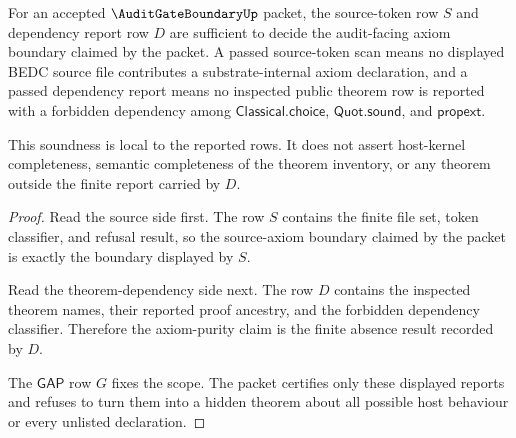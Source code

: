 \begin{theorem}
\label{thm:audit-gate-boundary-axiom-purity-soundness}
For an accepted $\AuditGateBoundaryUp$ packet, the source-token row $S$ and dependency report row $D$ are sufficient to decide the audit-facing axiom boundary claimed by the packet. A passed source-token scan means no displayed BEDC source file contributes a substrate-internal axiom declaration, and a passed dependency report means no inspected public theorem row is reported with a forbidden dependency among $\mathsf{Classical.choice}$, $\mathsf{Quot.sound}$, and $\mathsf{propext}$.

This soundness is local to the reported rows. It does not assert host-kernel completeness, semantic completeness of the theorem inventory, or any theorem outside the finite report carried by $D$.
\end{theorem}
\begin{proof}
Read the source side first. The row $S$ contains the finite file set, token classifier, and refusal result, so the source-axiom boundary claimed by the packet is exactly the boundary displayed by $S$.

Read the theorem-dependency side next. The row $D$ contains the inspected theorem names, their reported proof ancestry, and the forbidden dependency classifier. Therefore the axiom-purity claim is the finite absence result recorded by $D$.

The $\mathsf{GAP}$ row $G$ fixes the scope. The packet certifies only these displayed reports and refuses to turn them into a hidden theorem about all possible host behaviour or every unlisted declaration.
\end{proof}

